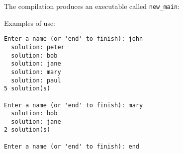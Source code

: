 The compilation produces an executable called \texttt{new\_main}:


Examples of use:

\begin{Indentation}
\begin{verbatim}
Enter a name (or 'end' to finish): john
  solution: peter
  solution: bob
  solution: jane
  solution: mary
  solution: paul
5 solution(s)

Enter a name (or 'end' to finish): mary
  solution: bob
  solution: jane
2 solution(s)

Enter a name (or 'end' to finish): end
\end{verbatim}
\end{Indentation}

